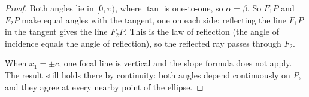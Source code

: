 \begin{proof}
  Both angles lie in $[0, \pi)$, where $\tan$ is one-to-one, so
  $\alpha = \beta$. So $F_1P$ and $F_2P$ make equal angles with the tangent,
  one on each side: reflecting the line $F_1P$ in the tangent gives the line
  $F_2P$. This is the law of reflection (the angle of incidence equals the
  angle of reflection), so the reflected ray passes through $F_2$.

  When $x_1 = \pm c$, one focal line is vertical and the slope formula does
  not apply. The result still holds there by continuity: both angles depend
  continuously on $P$, and they agree at every nearby point of the ellipse.
\end{proof}
